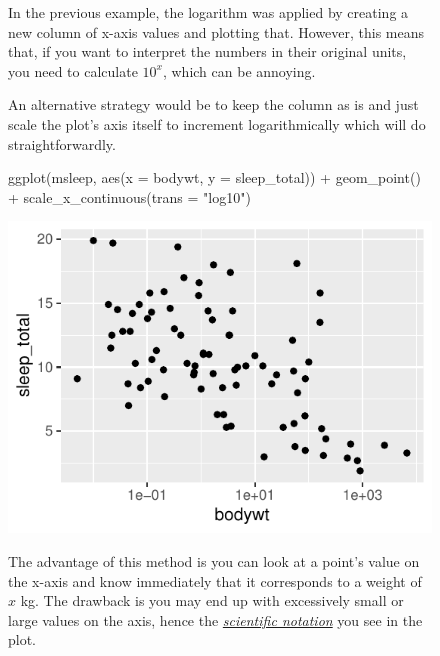 \begin{figure}[h]
    \centering
\begin{mdframed}[style = miscFrame, frametitle = Box 2.1: An alternative way to scale]

In the previous example, the logarithm was applied by creating a new column of x-axis values and plotting that. However, this means that, if you want to interpret the numbers in their original units, you need to calculate  $10^x$, which can be annoying.  

\vspace{1em}

An alternative strategy would be to keep the  column as is and just scale the plot's axis itself to increment logarithmically which  will do straightforwardly.

\begin{inR}
ggplot(msleep, aes(x = bodywt, y = sleep_total)) +
  geom_point() +
  scale_x_continuous(trans = "log10")
\end{inR}

\vspace{4em}
\includegraphics[scale = 0.7]{graphics/ch2Figs/ggEx_4.pdf}

\vspace{1em}

The advantage of this method is you can look at a point's value on the x-axis and know immediately that it corresponds to a weight of $x$ kg. The drawback is you may end up with excessively small or large values on the axis, hence the \href{https://www.mathsisfun.com/numbers/scientific-notation.html}{\textit{scientific notation}} you see in the plot.

\end{mdframed}
\end{figure}

